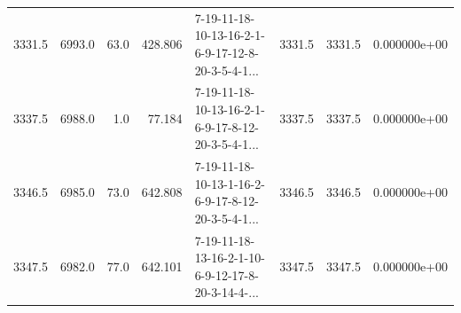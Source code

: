 \begin{tabular}{rrrrlrrr}
 3331.5 &  6993.0 &           63.0 &            428.806 &  7-19-11-18-10-13-16-2-1-6-9-17-12-8-20-3-5-4-1... &        3331.5 &          3331.5 &  0.000000e+00 \\
 3337.5 &  6988.0 &            1.0 &             77.184 &  7-19-11-18-10-13-16-2-1-6-9-17-8-12-20-3-5-4-1... &        3337.5 &          3337.5 &  0.000000e+00 \\
 3346.5 &  6985.0 &           73.0 &            642.808 &  7-19-11-18-10-13-1-16-2-6-9-17-8-12-20-3-5-4-1... &        3346.5 &          3346.5 &  0.000000e+00 \\
 3347.5 &  6982.0 &           77.0 &            642.101 &  7-19-11-18-13-16-2-1-10-6-9-12-17-8-20-3-14-4-... &        3347.5 &          3347.5 &  0.000000e+00 \\
\bottomrule
\end{tabular}

